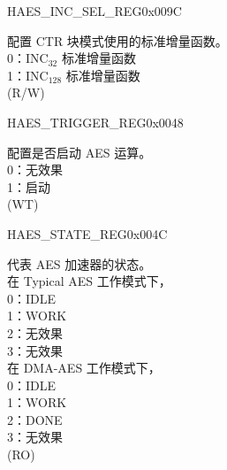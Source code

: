 \begin{register}{H}{AES\_INC\_SEL\_REG}{0x009C}\label{regdesc:AESINCSELREG}
%
%
\regnewline%
\begin{regdesc}\begin{reglist}
\item [AES\_INC\_SEL] 配置 CTR 块模式使用的标准增量函数。\\
0：INC$_{32}$ 标准增量函数\\
1：INC$_{128}$ 标准增量函数\\
(R/W)
\end{reglist}\end{regdesc}
\end{register}

\begin{register}{H}{AES\_TRIGGER\_REG}{0x0048}\label{regdesc:AESTRIGGERREG}
%
%
\regnewline%
\begin{regdesc}\begin{reglist}
\item [AES\_TRIGGER] 配置是否启动 AES 运算。\\
0：无效果\\
1：启动\\
(WT)
\end{reglist}\end{regdesc}
\end{register}


\begin{register}{H}{AES\_STATE\_REG}{0x004C}\label{regdesc:AESSTATEREG}
%
%
\regnewline%
\begin{regdesc}\begin{reglist}
\item [AES\_STATE] 代表 AES 加速器的状态。\\
在 Typical AES 工作模式下，\\
0：IDLE \\
1：WORK\\
2：无效果\\
3：无效果\\
在 DMA-AES 工作模式下，\\
0：IDLE\\
1：WORK\\
2：DONE\\
3：无效果\\
(RO) 
\end{reglist}\end{regdesc}
\end{register}

